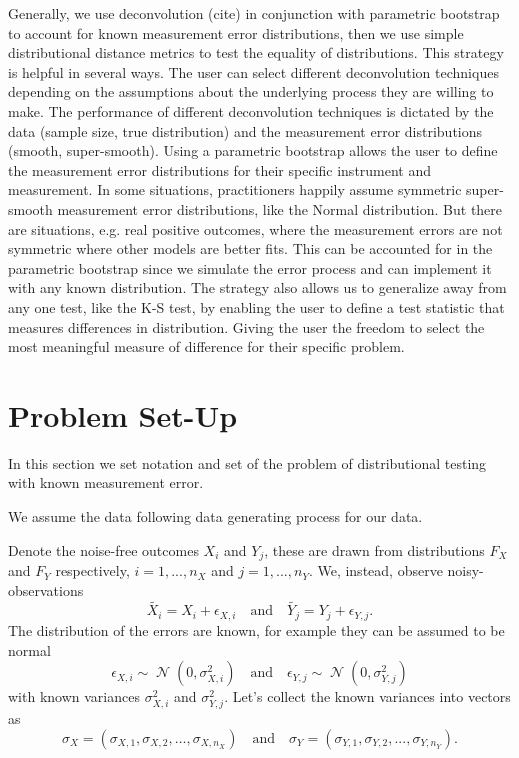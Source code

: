 \documentclass[12pt]{article}
\newcommand{\genericdel}[3]{%
  \left#1{#3}\right#2
}
\newcommand{\del}[1]{\genericdel(){#1}}
\DeclareMathOperator{\normal}{\mathcal{N}}
\begin{document}
Generally, we use deconvolution (cite) in conjunction with parametric bootstrap to account for known measurement error distributions, then we use simple distributional distance metrics to test the equality of distributions. This strategy is helpful in several ways. The user can select different deconvolution techniques depending on the assumptions about the underlying process they are willing to make. The performance of different deconvolution techniques is dictated by the data (sample size, true distribution) and the measurement error distributions (smooth, super-smooth). Using a parametric bootstrap allows the user to define the measurement error distributions for their specific instrument and measurement. In some situations, practitioners happily assume symmetric super-smooth measurement error distributions, like the Normal distribution. But there are situations, e.g. real positive outcomes, where the measurement errors are not symmetric where other models are better fits. This can be accounted for in the parametric bootstrap since we simulate the error process and can implement it with any known distribution. The strategy also allows us to generalize away from any one test, like the K-S test, by enabling the user to define a test statistic that measures differences in distribution. Giving the user the freedom to select the most meaningful measure of difference for their specific problem. 


\section{Problem Set-Up} %
\label{sec:problem_set_up}

In this section we set notation and set of the problem of distributional testing with known measurement error. 

We assume the data following data generating process for our data. 


Denote the noise-free outcomes $X_i$ and $Y_j$, these are drawn from distributions $F_X$ and $F_Y$ respectively, $i = 1, ..., n_X$ and $j = 1, ..., n_Y$. We, instead, observe noisy-observations 
\begin{equation}
    \widetilde{X_i} = X_i + \epsilon_{X,i}
    \quad\text{and}\quad
    \widetilde{Y_j} = Y_j + \epsilon_{Y,j}.
\end{equation}
The distribution of the errors are known, for example they can be assumed to be normal
\begin{equation}
    \epsilon_{X,i} \sim \normal\del{0, \sigma^2_{X,i}}
    \quad\text{and}\quad
    \epsilon_{Y,j} \sim \normal\del{0, \sigma^2_{Y,j}}
\end{equation}
with known variances $\sigma^2_{X,i}$ and $\sigma^2_{Y,j}$. Let's collect the known variances into vectors as
$$\sigma_X = (\sigma_{X,1}, \sigma_{X,2}, ..., \sigma_{X,n_X})
    \quad\text{and}\quad
\sigma_Y = (\sigma_{Y,1}, \sigma_{Y,2}, ..., \sigma_{Y,n_Y}).$$
\end{document}
